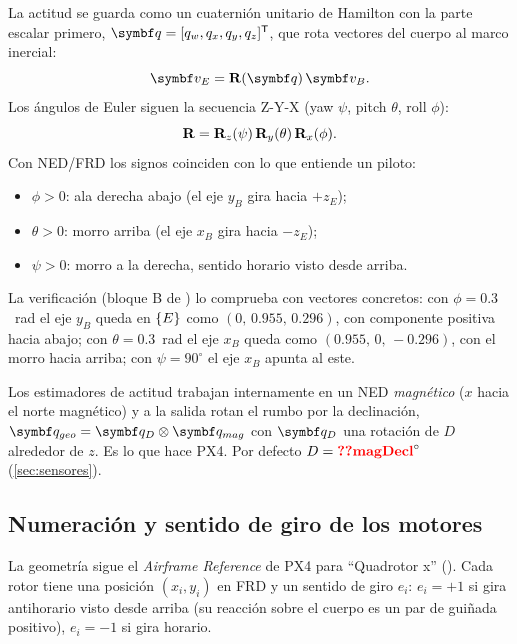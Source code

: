 La actitud se guarda como un cuaternión unitario de Hamilton con la parte
escalar primero, $\vect q=[q_w,q_x,q_y,q_z]\T$, que rota vectores del cuerpo
al marco inercial:
\begin{equation}
\vect v_E = \R(\vect q)\,\vect v_B .
\label{eq:RvB}
\end{equation}
Los ángulos de Euler siguen la secuencia Z-Y-X (yaw $\psi$, pitch $\theta$,
roll $\phi$):
\begin{equation}
\mathbf{R} = \mathbf{R}_z(\psi)\,\mathbf{R}_y(\theta)\,\mathbf{R}_x(\phi).
\label{eq:zyx}
\end{equation}
Con NED/FRD los signos coinciden con lo que entiende un piloto:
\begin{itemize}
\item $\phi>0$: ala derecha abajo (el eje $y_B$ gira hacia $+z_E$);
\item $\theta>0$: morro arriba (el eje $x_B$ gira hacia $-z_E$);
\item $\psi>0$: morro a la derecha, sentido horario visto desde arriba.
\end{itemize}

La verificación (bloque B de ) lo comprueba con
vectores concretos: con $\phi=0.3$~rad el eje $y_B$ queda en
$\{E\}$ como $(0,\,0.955,\,0.296)$, con componente positiva hacia abajo; con
$\theta=0.3$~rad el eje $x_B$ queda como $(0.955,\,0,\,-0.296)$, con el morro
hacia arriba; con $\psi=90^\circ$ el eje $x_B$ apunta al este.

\begin{nota}
Los estimadores de actitud trabajan internamente en un NED \emph{magnético}
($x$ hacia el norte magnético) y a la salida rotan el rumbo por la
declinación, $\vect q_{geo}=\vect q_{D}\otimes\vect q_{mag}$ con
$\vect q_D$ una rotación de $D$ alrededor de $z$. Es lo que hace PX4. Por
defecto $D=\val{magDecl}^\circ$ (\cref{sec:sensores}).
\end{nota}

\subsection{Numeración y sentido de giro de los motores}

La geometría sigue el \emph{Airframe Reference} de PX4 para ``Quadrotor x''
(). Cada rotor tiene una posición
$(x_i,y_i)$ en FRD y un sentido de giro $e_i$: $e_i=+1$ si gira antihorario
visto desde arriba (su reacción sobre el cuerpo es un par de guiñada
positivo), $e_i=-1$ si gira horario.

